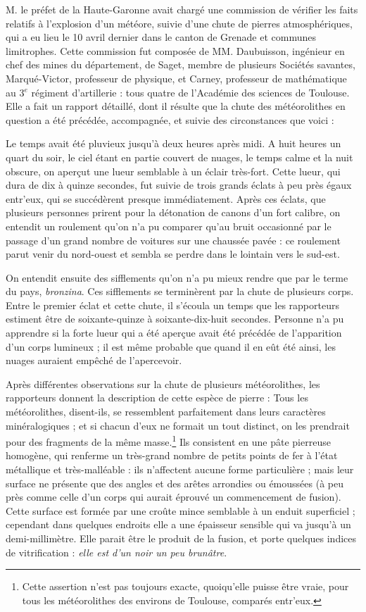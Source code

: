 \documentclass[a4paper, 12pt, oneside, french]{article}
\begin{document}
\og M. le préfet de la Haute-Garonne avait chargé une commission de vérifier les faits relatifs à l'explosion d'un météore, suivie d'une chute de pierres atmosphériques, qui a eu lieu le 10 avril dernier dans le canton de Grenade et communes limitrophes. Cette commission fut composée de MM. Daubuisson, ingénieur en chef des mines du département, de Saget, membre de plusieurs Sociétés savantes, Marqué-Victor, professeur de physique, et Carney, professeur de mathématique au 3$^{e}$ régiment d'artillerie : tous quatre de l'Académie des sciences de Toulouse. Elle a fait un rapport détaillé, dont il résulte que la chute des météorolithes en question a été précédée, accompagnée, et suivie des circonstances que voici : \fg

\og Le temps avait été pluvieux jusqu'à deux heures après midi. A huit heures un quart du soir, le ciel étant en partie couvert de nuages, le temps calme et la nuit obscure, on aperçut une lueur semblable à un éclair très-fort. Cette lueur, qui dura de dix à quinze secondes, fut suivie de trois grands éclats à peu près égaux entr'eux, qui se succédèrent presque immédiatement. Après ces éclats, que plusieurs personnes prirent pour la détonation de canons d'un fort calibre, on entendit un roulement qu'on n'a pu comparer qu'au bruit occasionné par le passage d'un grand nombre de voitures sur une chaussée pavée : ce roulement parut venir du nord-ouest et sembla se perdre dans le lointain vers le sud-est. \fg

\og On entendit ensuite des sifflements qu'on n'a pu mieux rendre que par le terme du pays, \emph{bronzina}. Ces sifflements se terminèrent par la chute de plusieurs corps. Entre le premier éclat et cette chute, il s'écoula un temps que les rapporteurs estiment être de soixante-quinze à soixante-dix-huit secondes. Personne n'a pu apprendre si la forte lueur qui a été aperçue avait été précédée de l'apparition d'un corps lumineux ; il est même probable que quand il en eût été ainsi, les nuages auraient empêché de l'apercevoir. \fg

\og Après différentes observations sur la chute de plusieurs météorolithes, les rapporteurs donnent la description de cette espèce de pierre : Tous les météorolithes, disent-ils, se ressemblent parfaitement dans leurs caractères minéralogiques ; et si chacun d'eux ne formait un tout distinct, on les prendrait pour des fragments de la même masse.\footnote{Cette assertion n'est pas toujours exacte, quoiqu'elle puisse être vraie, pour tous les météorolithes des environs de Toulouse, comparés entr'eux.} Ils consistent en une pâte pierreuse homogène, qui renferme un très-grand nombre de petits points de fer à l'état métallique et très-malléable : ils n'affectent aucune forme particulière ; mais leur surface ne présente que des angles et des arêtes arrondies ou émoussées (à peu près comme celle d'un corps qui aurait éprouvé un commencement de fusion). Cette surface est formée par une croûte mince semblable à un enduit superficiel ; cependant dans quelques endroits elle a une épaisseur sensible qui va jusqu'à un demi-millimètre. Elle parait être le produit de la fusion, et porte quelques indices de vitrification : \emph{elle est d'un noir un peu brunâtre}. \fg
\end{document}

